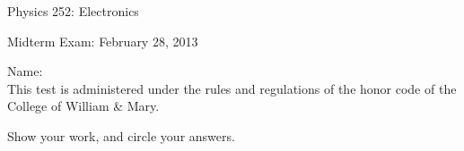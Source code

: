 \documentclass[letterpaper,addpoints,answers]{exam}
\begin{document}

\begin{coverpages}
 \large\bfseries
 
 \noindent 
 Physics 252: Electronics
 
 \vspace{2ex}
 \noindent
 Midterm Exam: February 28, 2013

 \vspace{5ex}
 \noindent 
 Name:\enspace\makebox[2in]{\hrulefill}\\

 \vspace{5ex}
 \noindent 
 This test is administered under the rules and regulations of the honor 
 code of the College of William \& Mary.  

 \vspace{5ex}
 \noindent 
 Show your work, and circle your answers.

 \vspace{5ex}
 \begin{center}
  \gradetable[v][questions]
 \end{center}
\end{coverpages}
 
\end{document}
